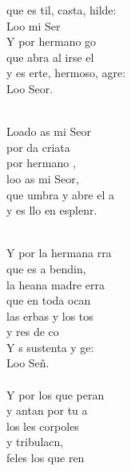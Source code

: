 \begin{cancion}
	que es til, casta, hilde: \\
	Loo mi Ser\\
	Y por  hermano go\\
	que abra al irse el \\
	y es erte, hermoso, agre:\\
	Loo Seor.\\\jump\\
	\begin{chorus}%
	Loado as mi Seor\\
	por da criata\\
	por  hermano ,\\
	loo as mi Seor,\\
	que umbra y abre el a \\
	y es llo en esplenr.\\
	\end{chorus}%
	\jump\\
	Y por la hermana rra\\
	que es a bendin, \\
	la heana madre erra\\
	que  en toda ocan \\
	las erbas y los tos \\
	y res de co\\
	Y s sustenta y ge: \\
	Loo Señ. \\
\jump\\
	Y por los que peran\\
	y antan por tu a\\
	los les corpoles \\
	y  tribulacn,\\
	feles los que ren \\

\end{cancion}
